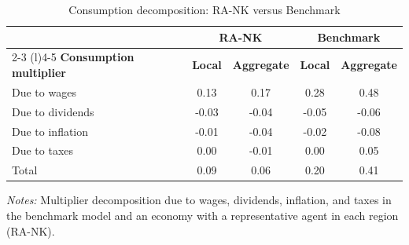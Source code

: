 \documentclass[\latexroot/\projectname]{subfiles}
\begin{document}
\begin{table}[h]
  \centering
  \caption{Consumption decomposition: RA-NK versus Benchmark\whenintegrated{\label{tab:robust-consumption-decomposition}}}
  \begin{tabular}{lcccc}
    \hline
     & \multicolumn{2}{c}{RA-NK} & \multicolumn{2}{c}{Benchmark} \\
     \cmidrule(l){2-3} \cmidrule(l){4-5}
    \textbf{Consumption multiplier} & \textbf{Local} & \textbf{Aggregate} & \textbf{Local} & \textbf{Aggregate} \\
    \hline
    Due to wages & 0.13 & 0.17 & 0.28 & 0.48 \\
    Due to dividends & -0.03 & -0.04 & -0.05 & -0.06 \\
    Due to inflation & -0.01 & -0.04 & -0.02 & -0.08 \\
    Due to taxes & 0.00 & -0.01 & 0.00 & 0.05 \\
    Total & 0.09 & 0.06 & 0.20 & 0.41 \\
    \hline
  \end{tabular}
  \begin{flushleft}
    \footnotesize
    \textit{Notes:} Multiplier decomposition due to wages, dividends, inflation, and taxes in the benchmark model and an economy with a representative agent in each region (RA-NK).
  \end{flushleft}
\end{table}

\smartbib
\end{document}
